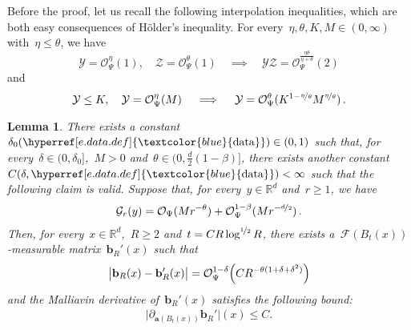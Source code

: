 \documentclass[11pt,twoside]{article} %
\numberwithin{equation}{section}
\newtheorem{lemma}[theorem]{Lemma}
\theoremstyle{definition}
\newcommand{\dataref}{\hyperref[e.data.def]{\textcolor{blue}{\ensuremath{\mathrm{data}}}}}
\newcommand*{\R}{\ensuremath{\mathbb{R}}}
\renewcommand{\b}{\ensuremath{\mathbf{b}}}
\renewcommand{\a}{\mathbf{a}}
\newcommand{\F}{\mathcal{F}}
\renewcommand{\O}{\mathcal{O}}
\newcommand{\Y}{\ensuremath{\mathcal{Y}}}
\begin{document}
\smallskip

Before the proof, let us recall the following interpolation inequalities, which are both easy consequences of H\"older's inequality. For every~$\eta,\theta,K,M \in (0,\infty)$ with~$\eta \leq \theta$, we have
\begin{equation} 
\label{e.Psi.product}
\Y = \O_{\Psi}^\eta (1), \quad \mathcal{Z}  = \O_{\Psi}^\theta (1) 
\quad \implies \quad  
\Y \mathcal{Z} = \O_{\Psi}^{ \frac{\eta \theta}{\eta + \theta} }(2)
\end{equation}
and
\begin{equation}  
\label{e.Psi.interpolation}
 \Y \leq K, \quad \Y = \O_{\Psi}^\eta (M)   
\quad \implies \quad  
\Y = \O_{\Psi}^\theta ( K^{1-\nicefrac \eta\theta} M^{\nicefrac \eta\theta})  
\,.
\end{equation}


\begin{lemma}
\label{l.correctorloc.new}
There exists a constant~$\delta_0(\dataref) \in (0,1)$ such that, for every~$\delta \in (0,\delta_0]$,~$M>0$ and~$\theta \in (0,\frac d2(1-\beta)]$, there exists another constant~$C(\delta,\dataref)<\infty$ such that the following claim is valid.  Suppose that, for every~$y \in \R^d$ and~$r \geq 1$, we have
\begin{align} \label{e.local.uglyG.cond}
\mathcal{G}_r (y) 
= 
\O_{\Psi}( M r^{-\theta}) + \O_{\Psi}^{1-\beta}( M r^{-\nicefrac d2} ) 
\,.
\end{align}
Then, for every~$x \in \R^d$,~$R \geq 2$ and~$t = C R \log^{\nicefrac12}R$, there exists a~$\F(B_{t}(x))$-measurable matrix~$\b_{R}'(x)$ such that 
\begin{align} \label{e.loc.berror}
 \big| \b_R(x) - \b_{R}'(x)  \big| 
=
\O_{\Psi}^{1-\delta } \Bigl( C R^{-\theta(1+\delta + \delta^2)} \Bigr)  
\end{align}
and the Malliavin derivative of~$\b_{R}'(x)$ satisfies the following bound:
\begin{align}  \label{e.malliavin.loc.improved}
\bigl|  \partial_{\a(B_{t}(x) )} \b_{R}'\bigr| (x)  \leq C .
\end{align}


\end{lemma}
\end{document}
